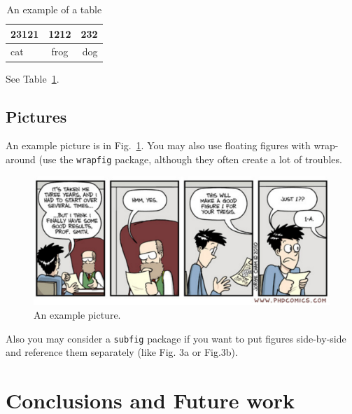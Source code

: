 \documentclass[a4paper,11pt,phdthesis,twoside,oneandhalfspace]{cssethesis}  %
\begin{document}
\begin{table}[ht]
	\begin{center}
	\begin{tabular}{lcr}
	23121 & 1212 & 232 \\ \hline  
	cat & frog & dog
	\end{tabular}
	\end{center}
\caption{An example of a table}
\label{tab:example}
\end{table}

See Table~\ref{tab:example}.


\section{Pictures}
An example picture is in Fig.~\ref{fig:examplepic}. You may also use floating figures with wrap-around (use the \verb|wrapfig| package, although they often create a lot of troubles.

\begin{figure}[ht!]
\centering\includegraphics[width=0.9\linewidth]{phd101310s}
\caption{An example picture.}
\label{fig:examplepic}
\end{figure}

Also you may consider a \verb|subfig| package if you want to put figures side-by-side and reference them separately (like Fig. 3a or Fig.3b).





\chapter{Conclusions and Future work}\label{chap:summary}



\appendix %
\end{document}
